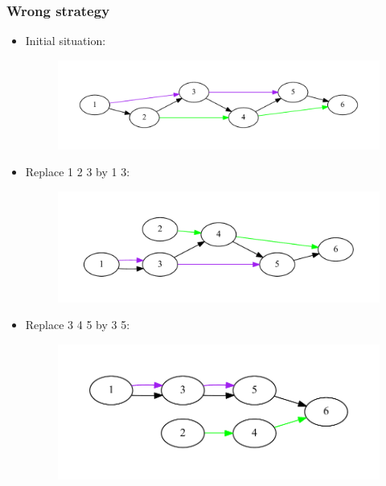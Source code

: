 \documentclass[svgnames,14pt]{beamer}
\begin{document}
\begin{frame}
\frametitle{Wrong strategy}
\begin{itemize}
\item Initial situation:
\begin{changemargin}{-1.cm}{-1.cm}
\begin{figure}
\centering
\includegraphics[scale = 0.38]{graph1.pdf}
\end{figure}
\end{changemargin}
\item Replace 1 2 3 by 1 3:
\begin{changemargin}{-1.cm}{-1.cm}
\begin{figure}
\centering
\includegraphics[scale = 0.38]{graph2.pdf}
\end{figure}
\end{changemargin}
\item Replace 3 4 5 by 3 5:
\begin{changemargin}{-1.cm}{-1.cm}
\begin{figure}
\centering
\includegraphics[scale = 0.38]{graph3.pdf}
\end{figure}
\end{changemargin}
\end{itemize}
\end{frame}
\end{document}
